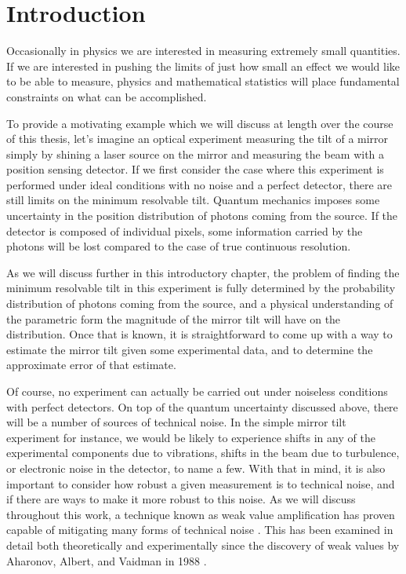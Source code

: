\chapter{Introduction}
Occasionally in physics we are interested in measuring extremely small quantities.  If we are interested in pushing the limits of just how small an effect we would like to be able to measure, physics and mathematical statistics will place fundamental constraints on what can be accomplished.

To provide a motivating example which we will discuss at length over the course of this thesis, let's imagine an optical experiment measuring the tilt of a mirror simply by shining a laser source on the mirror and measuring the beam with a position sensing detector.  If we first consider the case where this experiment is performed under ideal conditions with no noise and a perfect detector, there are still limits on the minimum resolvable tilt.  Quantum mechanics imposes some uncertainty in the position distribution of photons coming from the source.  If the detector is composed of individual pixels, some information carried by the photons will be lost compared to the case of true continuous resolution.

As we will discuss further in this introductory chapter, the problem of finding the minimum resolvable tilt in this experiment is fully determined by the probability distribution of photons coming from the source, and a physical understanding of the parametric form the magnitude of the mirror tilt will have on the distribution.  Once that is known, it is straightforward to come up with a way to estimate the mirror tilt given some experimental data, and to determine the approximate error of that estimate.

Of course, no experiment can actually be carried out under noiseless conditions with perfect detectors.  On top of the quantum uncertainty discussed above, there will be a number of sources of technical noise.  In the simple mirror tilt experiment for instance, we would be likely to experience shifts in any of the experimental components due to vibrations, shifts in the beam due to turbulence, or electronic noise in the detector, to name a few.  With that in mind, it is also important to consider how robust a given measurement is to technical noise, and if there are ways to make it more robust to this noise.  As we will discuss throughout this work, a technique known as weak value amplification has proven capable of mitigating many forms of technical noise \cite{Jordan2014, Starling2009}.  This has been examined in detail both theoretically and experimentally since the discovery of weak values by Aharonov, Albert, and Vaidman in 1988 \cite{Aharonov1988}.

